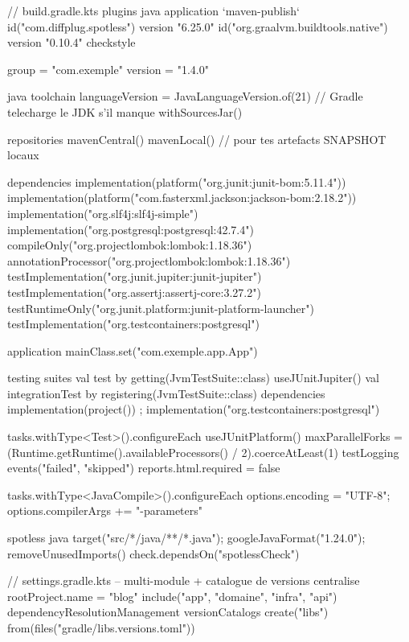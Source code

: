 \documentclass[12pt,a4paper,twoside,openright]{book}
\begin{document}
\begin{codeconf}
// build.gradle.kts
plugins {
    java
    application
    `maven-publish`
    id("com.diffplug.spotless") version "6.25.0"
    id("org.graalvm.buildtools.native") version "0.10.4"
    checkstyle
}

group = "com.exemple"
version = "1.4.0"

java {
    toolchain { languageVersion = JavaLanguageVersion.of(21) }   // Gradle telecharge le JDK s'il manque
    withSourcesJar()
}

repositories {
    mavenCentral()
    mavenLocal()                       // pour tes artefacts SNAPSHOT locaux
}

dependencies {
    implementation(platform("org.junit:junit-bom:5.11.4"))
    implementation(platform("com.fasterxml.jackson:jackson-bom:2.18.2"))
    implementation("org.slf4j:slf4j-simple")
    implementation("org.postgresql:postgresql:42.7.4")
    compileOnly("org.projectlombok:lombok:1.18.36")
    annotationProcessor("org.projectlombok:lombok:1.18.36")
    testImplementation("org.junit.jupiter:junit-jupiter")
    testImplementation("org.assertj:assertj-core:3.27.2")
    testRuntimeOnly("org.junit.platform:junit-platform-launcher")
    testImplementation("org.testcontainers:postgresql")
}

application { mainClass.set("com.exemple.app.App") }

testing {
    suites {
        val test by getting(JvmTestSuite::class) { useJUnitJupiter() }
        val integrationTest by registering(JvmTestSuite::class) {
            dependencies { implementation(project()) ; implementation("org.testcontainers:postgresql") }
        }
    }
}

tasks.withType<Test>().configureEach {
    useJUnitPlatform()
    maxParallelForks = (Runtime.getRuntime().availableProcessors() / 2).coerceAtLeast(1)
    testLogging { events("failed", "skipped") }
    reports.html.required = false
}

tasks.withType<JavaCompile>().configureEach { options.encoding = "UTF-8"; options.compilerArgs += "-parameters" }

spotless { java { target("src/*/java/**/*.java"); googleJavaFormat("1.24.0"); removeUnusedImports() } }
check.dependsOn("spotlessCheck")
\end{codeconf}

\begin{codeconf}
// settings.gradle.kts -- multi-module + catalogue de versions centralise
rootProject.name = "blog"
include("app", "domaine", "infra", "api")
dependencyResolutionManagement {
    versionCatalogs {
        create("libs") {
            from(files("gradle/libs.versions.toml"))
        }
    }
}
\end{codeconf}
\end{document}
